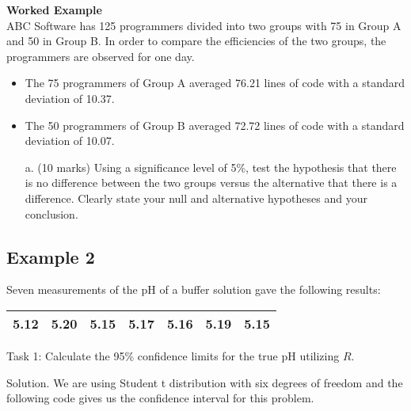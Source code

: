 	\item \textbf{Worked Example} \\ ABC Software has 125 programmers divided into two groups with 75 in
	Group A and 50 in Group B. In order to compare the efficiencies of the
	two groups, the programmers are observed for one day. \begin{itemize} \item The 75
		programmers of Group A averaged 76.21 lines of code with a standard
		deviation of 10.37. \item The 50 programmers of Group B averaged 72.72
		lines of code with a standard deviation of 10.07. \end{itemize}
	\begin{itemize}
		\item[a.](10 marks) Using a significance
		level of 5\%, test the hypothesis that there is no difference between the
		two groups versus the alternative that there is a difference. Clearly state
		your null and alternative hypotheses and your conclusion.
	\end{itemize}
	


\subsection{Example 2}

Seven measurements of the pH of a buffer solution gave the
following results:

\begin{center}
	\begin{tabular}{|c|c|c|c|c|c|c|}
		\hline
		5.12 & 5.20 & 5.15 & 5.17 & 5.16 & 5.19 & 5.15\\
		\hline
	\end{tabular}
\end{center}


Task 1: Calculate the 95\% confidence limits for the true pH
utilizing $R$.


Solution. We are using Student t distribution with six degrees of
freedom and the following code gives us the confidence interval
for this problem.

